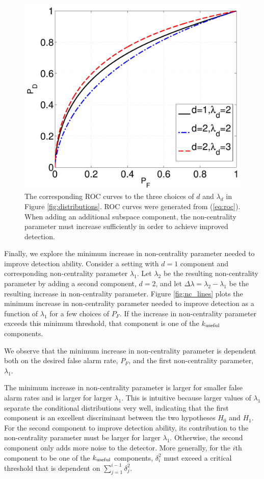 \begin{figure}[t]
  \centering
  \includegraphics[width=\figwidth]{taes_msd/figures/dist_roc.pdf}
  \caption{The corresponding ROC curves to the three choices of $d$ and $\lambda_d$ in
    Figure \ref{fig:distributions}. ROC curves were generated from (\ref{eq:roc}). When
    adding an additional subspace component, the non-centrality parameter must increase
    sufficiently in order to achieve improved detection. }
  \label{fig:dist_roc}
\end{figure}

Finally, we explore the minimum increase in non-centrality parameter needed to improve
detection ability. Consider a setting with $d=1$ component and corresponding
non-centrality parameter $\lambda_1$. Let $\lambda_2$ be the resulting non-centrality
parameter by adding a second component, $d=2$, and let $\Delta\lambda=\lambda_2-\lambda_1$
be the resulting increase in non-centrality parameter. Figure \ref{fig:nc_lines} plots the
minimum increase in non-centrality parameter needed to improve detection as a function of
$\lambda_1$ for a few choices of $P_F$. If the increase in non-centrality parameter
exceeds this minimum threshold, that component is one of the $k_{\text{useful}}$ components.

We observe that the minimum increase in non-centrality parameter is dependent both on the
desired false alarm rate, $P_F$, and the first non-centrality parameter, $\lambda_1$.

The minimum increase in non-centrality parameter is larger for smaller false alarm rates
and is larger for larger $\lambda_1$. This is intuitive because larger values of
$\lambda_1$ separate the conditional distributions very well, indicating that the first
component is an excellent discriminant between the two hypotheses $H_0$ and $H_1$. For the
second component to improve detection ability, its contribution to the non-centrality
parameter must be larger for larger $\lambda_1$. Otherwise, the second component only adds
more noise to the detector. More generally, for the $i$th component to be one of the
$k_{\text{useful}}$ components, $\delta_i^2$ must exceed a critical threshold that is dependent on
$\sum_{j=1}^{i-1}\delta_j^2$. 

